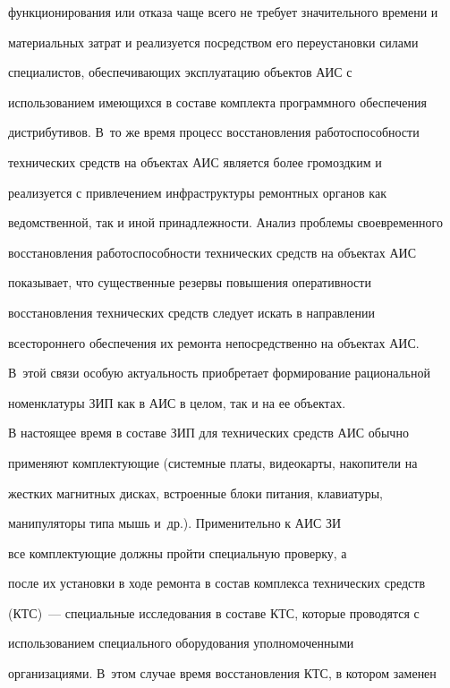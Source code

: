 функционирования или отказа чаще всего не требует значительного времени и 


материальных затрат и реализуется посредством его переустановки силами 


специалистов, обеспечивающих эксплуатацию объектов АИС с 


использованием имеющихся в составе комплекта программного обеспечения 


дистрибутивов. В~то же время процесс восстановления работоспособности 


технических средств на объектах АИС является более громоздким и 


реализуется с привлечением инфраструктуры ремонтных органов как 


ведомственной, так и иной принадлежности. Анализ проблемы своевременного 


восстановления работоспособности технических средств на объектах АИС 


показывает, что существенные резервы повышения оперативности 


восстановления технических средств следует искать в направлении 


всестороннего обеспечения их ремонта непосредственно на объектах АИС. 


В~этой связи особую актуальность приобретает формирование рациональной 


номенклатуры ЗИП как в АИС в целом, так и на ее объектах.


     


     В настоящее время в составе ЗИП для технических средств АИС обычно 


применяют комплектующие (системные платы, видеокарты, накопители на 


жестких магнитных дисках, встроенные блоки питания, клавиатуры, 


манипуляторы типа мышь и~др.). Применительно к АИС ЗИ 


все комплектующие должны пройти специальную проверку, а 


после их установки в ходе ремонта в состав комплекса технических средств 


(КТС)~--- специальные исследования в составе КТС, которые проводятся с 


использованием специального оборудования уполномоченными 


организациями. В~этом случае время восстановления КТС, в котором заменен 


